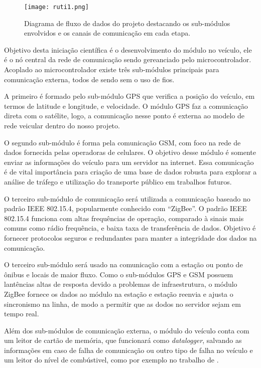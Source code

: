 \documentclass[12pt,report,cor2018]{uftpibic}
\begin{document}
\begin{figure}[!htpb]
\centering
\caption{Diagrama de fluxo de dados do projeto destacando os sub-módulos envolvidos e os canais de comunicação em cada etapa.}
\texttt{[image: ruti1.png]}
\label{fig:projeto}
\end{figure}

Objetivo desta iniciação científica é o desenvolvimento do módulo no veículo, ele é o nó central da rede de comunicação sendo gereanciado pelo microcontrolador. Acoplado ao microcontrolador existe três sub-módulos principais para comunicação externa, todos de sendo sem o uso de fios. 

A primeiro é formado pelo sub-módulo GPS que verifica a posição do veículo, em termos de latitude e longitude, e velocidade. O módulo GPS faz a comunicação direta com o satélite, logo, a comunicação nesse ponto é externa ao modelo de rede veicular dentro do nosso projeto. 

O segundo sub-módulo é forma pela comunicação GSM, com foco na rede de dados fornecida pelas operadoras de celulares. O objetivo desse módulo é somente enviar as informações do veículo para um servidor na internet. Essa comunicação é de vital importância para criação de uma base de dados robusta para explorar a análise de tráfego e utilização do transporte público em trabalhos futuros.

O terceiro sub-módulo de comunicação será utilizada a comunicação baseado no padrão IEEE 802.15.4, popularmente conhecido com ``ZigBee''. O padrão IEEE 802.15.4 funciona com altas frequências de operação, comparado à sinais mais comuns como rádio frequência, e baixa taxa de transferência de dados. Objetivo é fornecer protocolos seguros e redundantes para manter a integridade dos dados na comunicação. 

O terceiro sub-módulo será usado na comunicação com a estação ou ponto de ônibus e locais de maior fluxo. Como o sub-módulos GPS e GSM possuem lantências altas de resposta devido a problemas de infraestrutura, o módulo ZigBee fornece os dados ao módulo na estação e estação reenvia e ajusta o sincronismo na linha, de modo a permitir que as dodos no servidor sejam em tempo real.

Além dos sub-módulos de comunicação externa, o módulo do veículo conta com um leitor de cartão de memória, que funcionará como \textit{datalogger}, salvando as informações em caso de falha de comunicação ou outro tipo de falha no veículo e um leitor do nível de combústivel, como por exemplo no trabalho de . 
\end{document}
